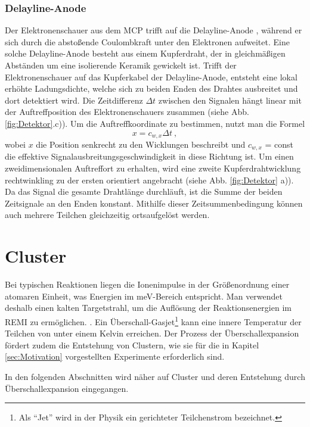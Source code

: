 \subsubsection{Delayline-Anode}

Der Elektronenschauer aus dem MCP trifft auf die Delayline-Anode \cite{sobottka1988}, während er sich durch die abstoßende Coulombkraft unter den Elektronen aufweitet. Eine solche Delayline-Anode besteht aus einem Kupferdraht, der in gleichmäßigen Abständen um eine isolierende Keramik gewickelt ist. Trifft der Elektronenschauer auf das Kupferkabel der Delayline-Anode, entsteht eine lokal erhöhte Ladungsdichte, welche sich zu beiden Enden des Drahtes ausbreitet und dort detektiert wird. Die Zeitdifferenz $\Delta t$ zwischen den Signalen hängt linear mit der Auftreffposition des Elektronenschauers zusammen (siehe Abb. \ref{fig:Detektor}.c)). Um die Auftreffkoordinate zu bestimmen, nutzt man die Formel
\begin{equation}
x = c_{w,x} \Delta t\ ,
\end{equation}
wobei $x$ die Position senkrecht zu den Wicklungen beschreibt und $c_{w,x}$ = const die effektive Signalausbreitungsgeschwindigkeit in diese Richtung ist. Um einen zweidimensionalen Auftreffort zu erhalten, wird eine zweite Kupferdrahtwicklung rechtwinkling zu der ersten orientiert angebracht (siehe Abb. \ref{fig:Detektor} a)). Da das Signal die gesamte Drahtlänge durchläuft, ist die Summe der beiden Zeitsignale an den Enden konstant. Mithilfe dieser Zeitsummenbedingung können auch mehrere Teilchen gleichzeitig ortsaufgelöst werden.
\clearpage
\section{Cluster} \label{sec:Cluster}

Bei typischen Reaktionen liegen die Ionenimpulse in der Größenordnung einer atomaren Einheit, was  Energien im meV-Bereich entspricht. Man verwendet deshalb einen kalten Targetstrahl, um die Auflösung der Reaktionsenergien im REMI zu ermöglichen. \cite{kurka07}. Ein Überschall-Gasjet\footnote{Als \enquote{Jet} wird in der Physik ein gerichteter Teilchenstrom bezeichnet.} kann eine innere Temperatur der Teilchen von unter einem Kelvin erreichen. Der Prozess der Überschallexpansion fördert zudem die Entstehung von Clustern, wie sie für die in Kapitel \ref{sec:Motivation} vorgestellten Experimente erforderlich sind.

In den folgenden Abschnitten wird näher auf Cluster und deren Entstehung durch Überschallexpansion eingegangen.


